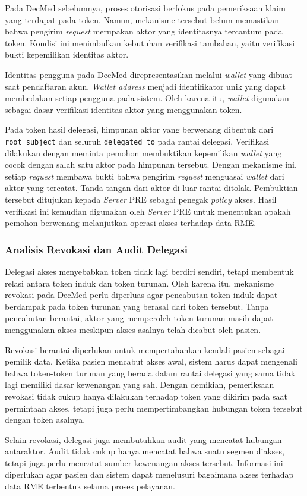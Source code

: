 Pada DecMed sebelumnya, proses otorisasi berfokus pada pemeriksaan klaim yang terdapat pada token. Namun, mekanisme tersebut belum memastikan bahwa pengirim \textit{request} merupakan aktor yang identitasnya tercantum pada token. Kondisi ini menimbulkan kebutuhan verifikasi tambahan, yaitu verifikasi bukti kepemilikan identitas aktor.

Identitas pengguna pada DecMed direpresentasikan melalui \textit{wallet} yang dibuat saat pendaftaran akun. \textit{Wallet address} menjadi identifikator unik yang dapat membedakan setiap pengguna pada sistem. Oleh karena itu, \textit{wallet} digunakan sebagai dasar verifikasi identitas aktor yang menggunakan token.

Pada token hasil delegasi, himpunan aktor yang berwenang dibentuk dari \texttt{root\_subject} dan seluruh \texttt{delegated\_to} pada rantai delegasi. Verifikasi dilakukan dengan meminta pemohon membuktikan kepemilikan \textit{wallet} yang cocok dengan salah satu aktor pada himpunan tersebut. Dengan mekanisme ini, setiap \textit{request} membawa bukti bahwa pengirim \textit{request} menguasai \textit{wallet} dari aktor yang tercatat. Tanda tangan dari aktor di luar rantai ditolak. Pembuktian tersebut ditujukan kepada \textit{Server} PRE sebagai penegak \textit{policy} akses. Hasil verifikasi ini kemudian digunakan oleh \textit{Server} PRE untuk menentukan apakah pemohon berwenang melanjutkan operasi akses terhadap data RME.

\subsubsection{Analisis Revokasi dan Audit Delegasi}
\label{subsec:analisis-revokasi-audit-delegasi}

Delegasi akses menyebabkan token tidak lagi berdiri sendiri, tetapi membentuk relasi antara token induk dan token turunan. Oleh karena itu, mekanisme revokasi pada DecMed perlu diperluas agar pencabutan token induk dapat berdampak pada token turunan yang berasal dari token tersebut. Tanpa pencabutan berantai, aktor yang memperoleh token turunan masih dapat menggunakan akses meskipun akses asalnya telah dicabut oleh pasien.

Revokasi berantai diperlukan untuk mempertahankan kendali pasien sebagai pemilik data. Ketika pasien mencabut akses awal, sistem harus dapat mengenali bahwa token-token turunan yang berada dalam rantai delegasi yang sama tidak lagi memiliki dasar kewenangan yang sah. Dengan demikian, pemeriksaan revokasi tidak cukup hanya dilakukan terhadap token yang dikirim pada saat permintaan akses, tetapi juga perlu mempertimbangkan hubungan token tersebut dengan token asalnya.

Selain revokasi, delegasi juga membutuhkan audit yang mencatat hubungan antaraktor. Audit tidak cukup hanya mencatat bahwa suatu segmen diakses, tetapi juga perlu mencatat sumber kewenangan akses tersebut. Informasi ini diperlukan agar pasien dan sistem dapat menelusuri bagaimana akses terhadap data RME terbentuk selama proses pelayanan.